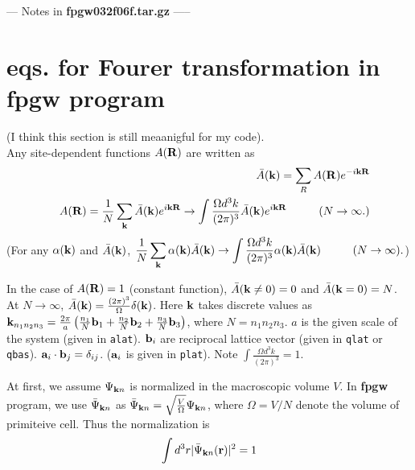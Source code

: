 \documentclass[a4paper,10pt,epsf,fleqn]{article}
\newcommand{\bfk}{{\bf k}}
\newcommand{\bfr}{{\bf r}}
\newcommand{\bfR}{{\bf R}}
\newcommand{\bfa}{{\bf a}}
\newcommand{\bfb}{{\bf b}}
\begin{document}
\newpage
{\huge --- Notes in {\bf fpgw032f06f.tar.gz} -----}
\section{eqs. for Fourer transformation in {\bf fpgw} program}

(I think this section is still meaanigful for my code).\\

Any site-dependent functions $A(\bfR)$ are written as
\begin{eqnarray}
&& \bar{A}(\bfk) = \sum_{R} A(\bfR) e^{-i \bfk \bfR} \\
&& A(\bfR) = \frac{1}{N} \sum_{\bfk} \bar{A}(\bfk) e^{i \bfk \bfR}
\rightarrow \int \frac{\Omega d^3 k  }{(2 \pi)^3} \bar{A}(\bfk) e^{i \bfk \bfR} 
\hspace{1cm}(N \to \infty.) 
\end{eqnarray}
(For any $\alpha(\bfk)$ and $\bar{A}(\bfk)$, 
$ \displaystyle
\frac{1}{N} \sum_{\bfk} \alpha(\bfk) \bar{A}(\bfk) 
\rightarrow \int \frac{\Omega d^3 k  }{(2 \pi)^3} 
\alpha(\bfk) \bar{A}(\bfk) \hspace{1cm}(N \to \infty).
$)

In the case of $A(\bfR)=1$ (constant function), 
$\bar{A}(\bfk\ne0) = 0$ and $\bar{A}(\bfk=0) = N$.
At $N \to \infty$, 
$\bar{A}(\bfk) = \frac{(2 \pi)^3}{\Omega} \delta(\bfk)$.
Here $\bfk$ takes discrete values as 
$\bfk_{n_1 n_2 n_3}= \frac{2 \pi}{a}
\left( \frac{n_1}{N} \bfb_1 +\frac{n_2}{N} \bfb_2 +\frac{n_3}{N} \bfb_3 \right)$, 
where $N=n_1 n_2 n_3$.
$a$ is the given scale of the system (given in {\tt alat}).
$\bfb_i$ are reciprocal lattice vector (given in {\tt qlat} or {\tt qbas}). 
$ \bfa_i \cdot \bfb_j =\delta_{ij}$. ($ \bfa_i$ is given in {\tt plat}).
Note $\int \frac{ \Omega d^3 k }{(2 \pi)^3} =1$.


At first, we assume $\Psi_{\bfk n}$ is normalized in the macroscopic volume $V$. 
In {\bf fpgw} program, we use $\bar\Psi_{\bfk n}$ as
$\bar{\Psi}_{\bfk n}= \sqrt{\frac{V}{\Omega}} {\Psi}_{\bfk n}$,
where $\Omega=V/N$ denote the volume of primiteive cell.
Thus the normalization is
\begin{eqnarray}
\int d^3 r  |\bar{\Psi}_{\bfk n}(\bfr)|^2 =1
\end{eqnarray}
\end{document}

